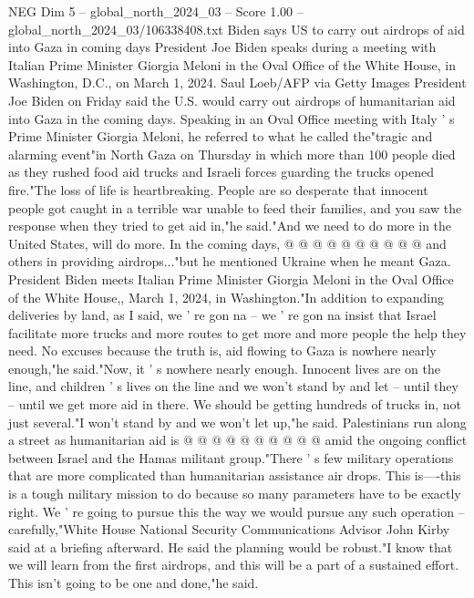 \begin{textsample}{NEG Dim 5 – global\_north\_2024\_03 – Score 1.00 – global\_north\_2024\_03/106338408.txt}  \label{ex:f5_neg_089}
Biden says US to carry out airdrops of aid into Gaza in coming days President Joe Biden speaks during a meeting with Italian Prime Minister Giorgia Meloni in the Oval Office of the White House, in Washington, D.C., on March 1, 2024.
Saul Loeb/AFP via Getty Images President Joe Biden on Friday said the U.S. would carry out airdrops of humanitarian aid into Gaza in the coming days.
Speaking in an Oval Office meeting with Italy ' s Prime Minister Giorgia Meloni, he referred to what he called the"tragic and alarming event"in North Gaza on Thursday in which more than 100 people died as they rushed food aid trucks and Israeli forces guarding the trucks opened fire."The loss of life is heartbreaking.
People are so desperate that innocent people got caught in a terrible war unable to feed their families, and you saw the response when they tried to get aid in,"he said."And we need to do more in the United States, will do more.
In the coming days, @ @ @ @ @ @ @ @ @ @ and others in providing airdrops..."but he mentioned Ukraine when he meant Gaza.
President Biden meets Italian Prime Minister Giorgia Meloni in the Oval Office of the White House,, March 1, 2024, in Washington."In addition to expanding deliveries by land, as I said, we ' re gon na -- we ' re gon na insist that Israel facilitate more trucks and more routes to get more and more people the help they need.
No excuses because the truth is, aid flowing to Gaza is nowhere nearly enough,"he said."Now, it ' s nowhere nearly enough.
Innocent lives are on the line, and children ' s lives on the line and we won't stand by and let -- until they -- until we get more aid in there.
We should be getting hundreds of trucks in, not just several."I won't stand by and we won't let up,"he said.
Palestinians run along a street as humanitarian aid is @ @ @ @ @ @ @ @ @ @ amid the ongoing conflict between Israel and the Hamas militant group."There ' s few military operations that are more complicated than humanitarian assistance air drops.
This is----this is a tough military mission to do because so many parameters have to be exactly right.
We ' re going to pursue this the way we would pursue any such operation -- carefully,"White House National Security Communications Advisor John Kirby said at a briefing afterward.
He said the planning would be robust."I know that we will learn from the first airdrops, and this will be a part of a sustained effort.
This isn't going to be one and done,"he said.

\end{textsample}
